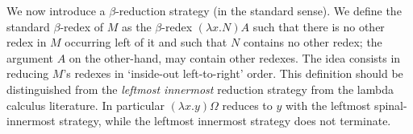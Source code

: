 \documentclass{elsarticle}
\theoremstyle{plain}
\theoremstyle{definition}
\begin{document}
We now introduce a $\beta$-reduction strategy (in the standard sense).
We define the  standard $\beta$-redex of $M$ as the $\beta$-redex $(\lambda x . N) A$ such that there is no other redex in $M$ occurring left of it and such that $N$ contains no other redex; the argument $A$ on the other-hand, may contain other redexes.
The idea consists in reducing $M$'s redexes in `inside-out left-to-right' order.
This definition should be distinguished from the \emph{leftmost innermost} reduction strategy from the lambda calculus literature.
In particular $(\lambda x . y) \Omega$ reduces to $y$ with the leftmost spinal-innermost strategy, while the leftmost innermost strategy does not terminate.

\end{document}
